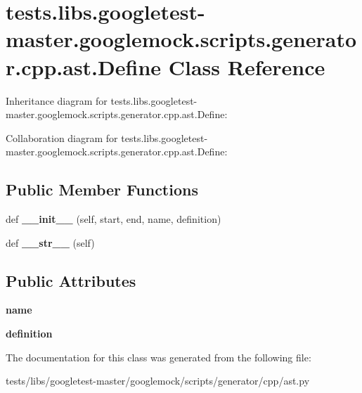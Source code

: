 \hypertarget{classtests_1_1libs_1_1googletest-master_1_1googlemock_1_1scripts_1_1generator_1_1cpp_1_1ast_1_1Define}{}\section{tests.\+libs.\+googletest-\/master.googlemock.\+scripts.\+generator.\+cpp.\+ast.\+Define Class Reference}
\label{classtests_1_1libs_1_1googletest-master_1_1googlemock_1_1scripts_1_1generator_1_1cpp_1_1ast_1_1Define}


Inheritance diagram for tests.\+libs.\+googletest-\/master.googlemock.\+scripts.\+generator.\+cpp.\+ast.\+Define\+:


Collaboration diagram for tests.\+libs.\+googletest-\/master.googlemock.\+scripts.\+generator.\+cpp.\+ast.\+Define\+:
\subsection*{Public Member Functions}
\begin{DoxyCompactItemize}
\item 
\mbox{\label{classtests_1_1libs_1_1googletest-master_1_1googlemock_1_1scripts_1_1generator_1_1cpp_1_1ast_1_1Define_ae3891828aeb729886e8ae4a60a873839}} 
def {\bfseries \+\_\+\+\_\+init\+\_\+\+\_\+} (self, start, end, name, definition)
\item 
\mbox{\label{classtests_1_1libs_1_1googletest-master_1_1googlemock_1_1scripts_1_1generator_1_1cpp_1_1ast_1_1Define_af941a3a067c42373f9d218bc6323a9f1}} 
def {\bfseries \+\_\+\+\_\+str\+\_\+\+\_\+} (self)
\end{DoxyCompactItemize}
\subsection*{Public Attributes}
\begin{DoxyCompactItemize}
\item 
\mbox{\label{classtests_1_1libs_1_1googletest-master_1_1googlemock_1_1scripts_1_1generator_1_1cpp_1_1ast_1_1Define_a79c3a55248cb00854259572c654349ca}} 
{\bfseries name}
\item 
\mbox{\label{classtests_1_1libs_1_1googletest-master_1_1googlemock_1_1scripts_1_1generator_1_1cpp_1_1ast_1_1Define_adc0c4ae2f4a77f2bc9bd4ab580d75d3a}} 
{\bfseries definition}
\end{DoxyCompactItemize}


The documentation for this class was generated from the following file\+:\begin{DoxyCompactItemize}
\item 
tests/libs/googletest-\/master/googlemock/scripts/generator/cpp/ast.\+py\end{DoxyCompactItemize}
